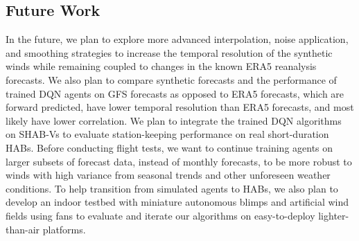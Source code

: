 \subsection{Future Work}

In the future, we plan to explore more advanced interpolation, noise application, and smoothing strategies to increase the temporal resolution of the synthetic winds while remaining coupled to changes in the known ERA5 reanalysis forecasts. We also plan to compare synthetic forecasts and the performance of trained DQN agents on GFS forecasts as opposed to ERA5 forecasts, which are forward predicted, have lower temporal resolution than ERA5 forecasts, and most likely have lower correlation.  We plan to integrate the trained DQN algorithms on SHAB-Vs to evaluate station-keeping performance on real short-duration HABs.  Before conducting flight tests, we want to continue training agents on larger subsets of forecast data, instead of monthly forecasts, to be more robust to winds with high variance from seasonal trends and other unforeseen weather conditions.  To help transition from simulated agents to HABs, we also plan to develop an indoor testbed with miniature autonomous blimps and artificial wind fields using fans to evaluate and iterate our algorithms on easy-to-deploy lighter-than-air platforms.   



